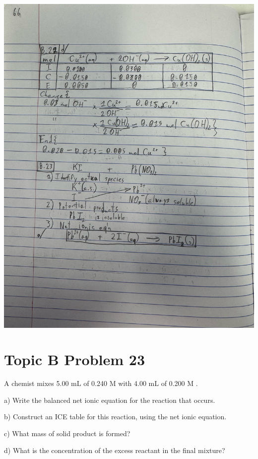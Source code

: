 \documentclass[10pt]{article}
\begin{document}
\begin{center}
                \includegraphics[width=\textwidth, trim={5in 27in 3in 7in},clip]{"Answers Images/IMG_6652.jpg"}
            \end{center}

    \pagebreak
    \section{Topic B Problem 23}
        A chemist mixes 5.00 mL of 0.240 M  with 4.00 mL of 0.200 M .
        
        a) Write the balanced net ionic equation for the reaction that occurs.
        
        b) Construct an ICE table for this reaction, using the net ionic equation.
        
        c) What mass of solid product is formed?
        
        d) What is the concentration of the excess reactant in the final mixture?
        
\end{document}
